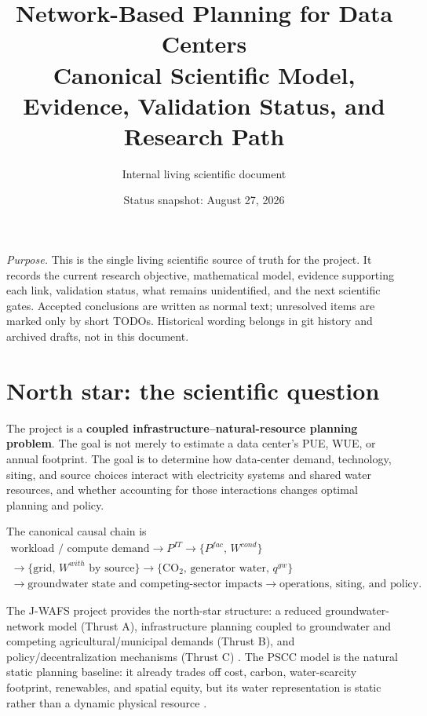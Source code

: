 \documentclass[11pt]{article}
\title{\textbf{Network-Based Planning for Data Centers}\\
\large Canonical Scientific Model, Evidence, Validation Status, and Research Path}
\author{Internal living scientific document}
\date{Status snapshot: August 27, 2026}
\begin{document}
\maketitle
\vspace{-0.8em}

\begin{center}
\small
\textit{Purpose.} This is the single living scientific source of truth for the project. It records the current research objective, mathematical model, evidence supporting each link, validation status, what remains unidentified, and the next scientific gates. Accepted conclusions are written as normal text; unresolved items are marked only by short TODOs. Historical wording belongs in git history and archived drafts, not in this document.
\end{center}

\section{North star: the scientific question}

The project is a \textbf{coupled infrastructure--natural-resource planning problem}. The goal is not merely to estimate a data center's PUE, WUE, or annual footprint. The goal is to determine how data-center demand, technology, siting, and source choices interact with electricity systems and shared water resources, and whether accounting for those interactions changes optimal planning and policy.

The canonical causal chain is
\[
\boxed{\begin{gathered}
\text{workload / compute demand}
\rightarrow P^{IT}
\rightarrow \{P^{fac},\,W^{cond}\}\\
\rightarrow \{\text{grid},\,W^{with}\text{ by source}\}
\rightarrow \{\mathrm{CO_2},\,\text{generator water},\,q^{gw}\}\\
\rightarrow \text{groundwater state and competing-sector impacts}
\rightarrow \text{operations, siting, and policy}.
\end{gathered}}
\]

The J-WAFS project provides the north-star structure: a reduced groundwater-network model (Thrust A), infrastructure planning coupled to groundwater and competing agricultural/municipal demands (Thrust B), and policy/decentralization mechanisms (Thrust C) \cite{jwa}. The PSCC model is the natural static planning baseline: it already trades off cost, carbon, water-scarcity footprint, renewables, and spatial equity, but its water representation is static rather than a dynamic physical resource \cite{pscc}.
\end{document}
